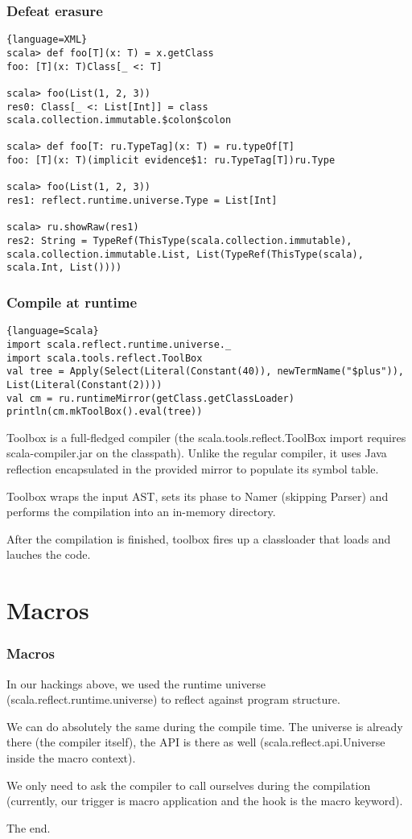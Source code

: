 \documentclass[hyperref={bookmarks=false}]{beamer}
\begin{document}
\begin{frame}[fragile]
\frametitle{Defeat erasure}

\begin{lstlisting}{language=XML}
scala> def foo[T](x: T) = x.getClass
foo: [T](x: T)Class[_ <: T]

scala> foo(List(1, 2, 3))
res0: Class[_ <: List[Int]] = class scala.collection.immutable.$colon$colon

scala> def foo[T: ru.TypeTag](x: T) = ru.typeOf[T]
foo: [T](x: T)(implicit evidence$1: ru.TypeTag[T])ru.Type

scala> foo(List(1, 2, 3))
res1: reflect.runtime.universe.Type = List[Int]

scala> ru.showRaw(res1)
res2: String = TypeRef(ThisType(scala.collection.immutable), scala.collection.immutable.List, List(TypeRef(ThisType(scala), scala.Int, List())))
\end{lstlisting}
\end{frame}

\begin{frame}[fragile]
\frametitle{Compile at runtime}

\begin{lstlisting}{language=Scala}
import scala.reflect.runtime.universe._
import scala.tools.reflect.ToolBox
val tree = Apply(Select(Literal(Constant(40)), newTermName("$plus")), List(Literal(Constant(2))))
val cm = ru.runtimeMirror(getClass.getClassLoader)
println(cm.mkToolBox().eval(tree))
\end{lstlisting}

Toolbox is a full-fledged compiler (the scala.tools.reflect.ToolBox import requires scala-compiler.jar on the classpath). Unlike the regular compiler, it uses Java reflection encapsulated in the provided mirror to populate its symbol table.

Toolbox wraps the input AST, sets its phase to Namer (skipping Parser) and performs the compilation into an in-memory directory.

After the compilation is finished, toolbox fires up a classloader that loads and lauches the code.

\end{frame}

\section{Macros}

\begin{frame}[fragile]
\frametitle{Macros}

In our hackings above, we used the runtime universe (scala.reflect.runtime.universe) to reflect against program structure.

We can do absolutely the same during the compile time.
The universe is already there (the compiler itself), the API is there as well
(scala.reflect.api.Universe inside the macro context).

We only need to ask the compiler to call ourselves during the compilation
(currently, our trigger is macro application and the hook is the macro keyword).

The end.

\end{frame}
\end{document}
